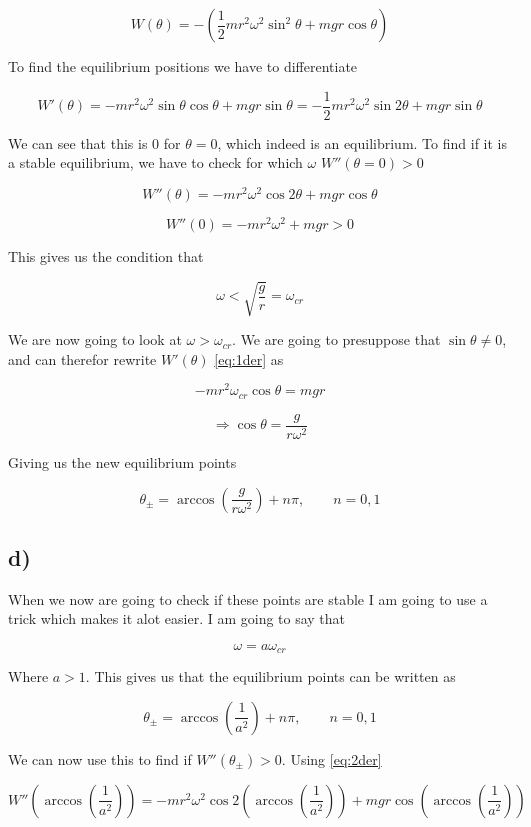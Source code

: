 \documentclass[a4paper,norsk, 10pt]{article}
\begin{document}
$$
W(\theta) = -(\frac{1}{2}mr^2\omega^2\sin^2\theta + mgr\cos\theta)
$$

To find the equilibrium positions we have to differentiate

\begin{equation}
W'(\theta) = -mr^2\omega^2\sin\theta\cos\theta + mgr\sin\theta = -\frac{1}{2} mr^2\omega^2\sin 2\theta + mgr\sin\theta
\label{eq:1der}
\end{equation}

We can see that this is 0 for $\theta = 0$, which indeed is an equilibrium. To find if it is a stable equilibrium, we have to check for which $\omega$ $W''(\theta = 0) > 0$

\begin{equation}
W''(\theta) = -mr^2\omega^2\cos 2\theta + mgr\cos\theta
\label{eq:2der}
\end{equation}

$$
W''(0) = -mr^2\omega^2 +mgr > 0
$$

This gives us the condition that

$$
\omega < \sqrt{\frac{g}{r}} = \omega_{cr}
$$

We are now going to look at $\omega > \omega_{cr}$. We are going to presuppose that $\sin\theta \neq 0$, and can therefor rewrite $W'(\theta)$ \ref{eq:1der} as

$$
-mr^2\omega_{cr}\cos\theta = mgr
$$

$$
\Rightarrow \cos\theta = \frac{g}{r\omega^2}
$$

Giving us the new equilibrium points

$$
\theta_{\pm} = \arccos(\frac{g}{r\omega^2}) + n\pi, \qquad n= 0,1
$$

\subsection*{d)}

When we now are going to check if these points are stable I am going to use a trick which makes it alot easier. I am going to say that 

$$
\omega = a\omega_{cr}
$$

Where $a>1$. This gives us that the equilibrium points can be written as

$$
\theta_{\pm} = \arccos(\frac{1}{a^2}) + n\pi, \qquad n= 0,1
$$

We can now use this to find if $W''(\theta_{\pm}) > 0$. Using \ref{eq:2der}

$$
W''(\arccos(\frac{1}{a^2})) =  -mr^2\omega^2\cos 2(\arccos(\frac{1}{a^2})) + mgr\cos(\arccos(\frac{1}{a^2}))
$$
\end{document}
